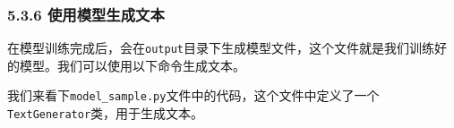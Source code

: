 \documentclass[12pt,a4paper]{book}
\begin{document}
\subsubsection{5.3.6
使用模型生成文本}\label{ux4f7fux7528ux6a21ux578bux751fux6210ux6587ux672c}

在模型训练完成后，会在\texttt{output}目录下生成模型文件，这个文件就是我们训练好的模型。我们可以使用以下命令生成文本。

\begin{Shaded}
\begin{Highlighting}[]
\end{Highlighting}
\end{Shaded}

我们来看下\texttt{model\_sample.py}文件中的代码，这个文件中定义了一个\texttt{TextGenerator}类，用于生成文本。
\end{document}
